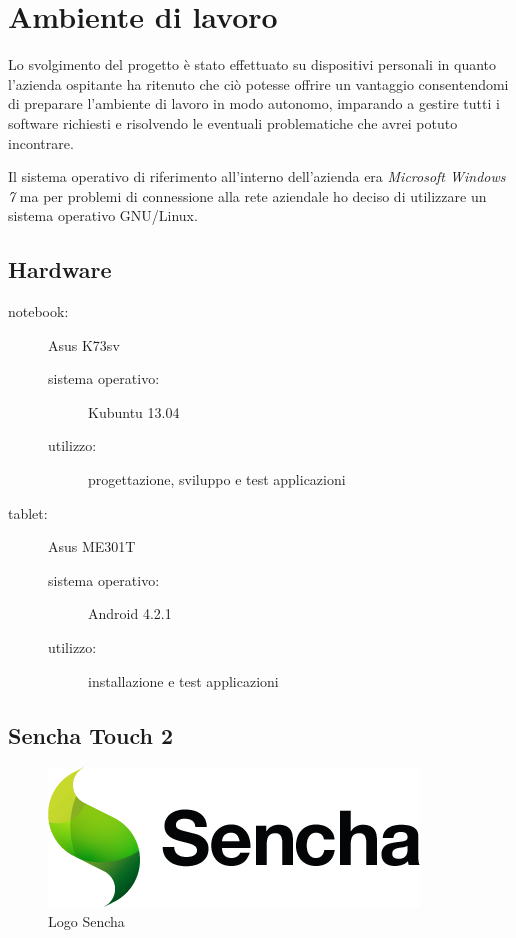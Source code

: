 \chapter{Ambiente di lavoro}\label{ch:ambiente}
Lo svolgimento del progetto è stato effettuato su dispositivi personali in quanto l'azienda ospitante ha ritenuto che ciò potesse offrire un vantaggio consentendomi di preparare l'ambiente di lavoro in modo autonomo, imparando a gestire tutti i software richiesti e risolvendo le eventuali problematiche che avrei potuto incontrare.

Il sistema operativo di riferimento all'interno dell'azienda era \emph{Microsoft Windows 7} ma per problemi di connessione alla rete aziendale ho deciso di utilizzare un sistema operativo GNU/Linux.

\section{Hardware}
\begin{description}
\item[notebook:] Asus K73sv
	\begin{description}
	\item[sistema operativo:] Kubuntu 13.04
	\item[utilizzo:] progettazione, sviluppo e test applicazioni
	\end{description}
\item[tablet:] Asus ME301T
	\begin{description}
	\item[sistema operativo:] Android 4.2.1
	\item[utilizzo:] installazione e test applicazioni
	\end{description}
\end{description}

\section{Sencha Touch 2}
\begin{figure}[htb]
\centering
\includegraphics[scale=0.4]{gfx/sencha-large}
\caption{Logo Sencha}
\label{fig:sencha}
\end{figure}

